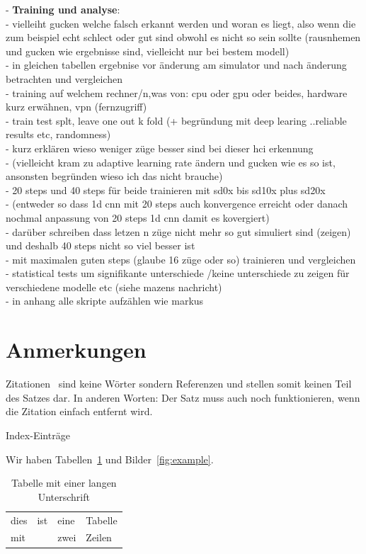 - \textbf{Training und analyse}:\\
- vielleiht gucken welche falsch erkannt werden und woran es liegt, also wenn die zum beispiel echt schlect oder gut sind obwohl es nicht so sein sollte (rausnhemen und gucken wie ergebnisse sind, vielleicht nur bei bestem modell)\\
- in gleichen tabellen ergebnise vor änderung am simulator und nach änderung betrachten und vergleichen\\
- training auf welchem rechner/n,was von: cpu oder gpu oder beides, hardware kurz erwähnen, vpn (fernzugriff)\\
- train test splt, leave one out k fold (+ begründung mit deep learing ..reliable results etc, randomness) \\
- kurz erklären wieso weniger züge besser sind bei dieser hci erkennung\\
- (vielleicht kram zu adaptive learning rate ändern und gucken wie es so ist, ansonsten begründen wieso ich das nicht brauche) \\
- 20 steps und 40 steps für beide trainieren mit sd0x bis sd10x plus sd20x\\
- (entweder so dass 1d cnn mit 20 steps auch konvergence erreicht oder danach nochmal anpassung von 20 steps 1d cnn damit es kovergiert)\\
- darüber schreiben dass letzen n züge nicht mehr so gut simuliert sind (zeigen) und deshalb 40 steps nicht so viel besser ist \\
- mit maximalen guten steps (glaube 16 züge oder so) trainieren und vergleichen\\
- statistical tests um signifikante unterschiede /keine unterschiede zu zeigen für verschiedene modelle etc (siehe mazens nachricht)\\

- in anhang alle skripte aufzählen wie markus 


\section{Anmerkungen}
Zitationen~\cite{Rabiner89-ATO} sind keine Wörter sondern Referenzen und stellen somit keinen Teil des Satzes dar. In anderen Worten: Der Satz muss auch noch funktionieren, wenn die Zitation einfach entfernt wird.


Index-Einträge~

Wir haben Tabellen~\ref{tab:example} und Bilder~\ref{fig:example}.

\begin{table}
 \centering
 \begin{tabular}{llll}
  \toprule
  dies & ist & eine & Tabelle \\
  mit  &     & zwei & Zeilen \\
  \bottomrule
 \end{tabular}
 \caption[Tabelle mit kurzer Unterschrift]{Tabelle mit einer langen Unterschrift}
 \label{tab:example}
\end{table}



